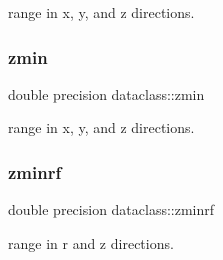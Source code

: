 range in x, y, and z directions. 

\mbox{\label{namespacedataclass_a9c2398fd87701d5c0de37ff6b3357a0c}} 
\subsubsection{\texorpdfstring{zmin}{zmin}}
{\footnotesize\ttfamily double precision dataclass\+::zmin}



range in x, y, and z directions. 

\mbox{\label{namespacedataclass_a24985c63a3d2c04ccb2cf299eff0c626}} 
\subsubsection{\texorpdfstring{zminrf}{zminrf}}
{\footnotesize\ttfamily double precision dataclass\+::zminrf}



range in r and z directions. 

